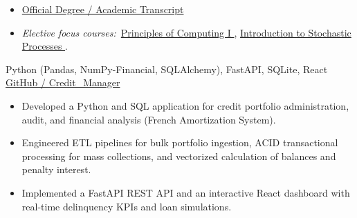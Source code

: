 \documentclass[english]{CV_template}
\begin{document}

\begin{itemize}
    \item \href{https://1drv.ms/b/s!Anr_tvZIYrhwhLl3kbwqZnLPbGGHFg?e=MsCJnp}{Official Degree / Academic Transcript {\footnotesize\faExternalLink}}
    \item \textit{Elective focus courses:}\ \href{https://1drv.ms/b/s!Anr_tvZIYrhwg-Q3BLmxwlzX5PWIFQ}{Principles of Computing I {\footnotesize\faExternalLink}}, \href{https://1drv.ms/b/s!Anr_tvZIYrhwg-Q45aG0UgNb-R70FA?e=44lo7C}{Introduction to Stochastic Processes {\footnotesize\faExternalLink}}.
\end{itemize}

\newpage


{Python (Pandas, NumPy-Financial, SQLAlchemy), FastAPI, SQLite, React}
{\href{https://github.com/JuanMCarini/Credit_Manager}{GitHub / Credit\_Manager {\footnotesize\faExternalLink}}}
\begin{itemize}
    \item Developed a Python and SQL application for credit portfolio administration, audit, and financial analysis (French Amortization System).
    \item Engineered ETL pipelines for bulk portfolio ingestion, ACID transactional processing for mass collections, and vectorized calculation of balances and penalty interest.
    \item Implemented a FastAPI REST API and an interactive React dashboard with real-time delinquency KPIs and loan simulations.
\end{itemize}
\end{document}
